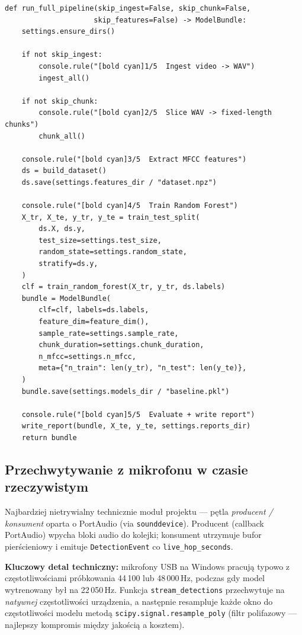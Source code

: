 \documentclass[11pt,a4paper]{article}
\begin{document}
\begin{lstlisting}[caption={Orchestrator treningu (\texttt{pipeline/train.py}, fragment).},label={lst:train}]
def run_full_pipeline(skip_ingest=False, skip_chunk=False,
                     skip_features=False) -> ModelBundle:
    settings.ensure_dirs()

    if not skip_ingest:
        console.rule("[bold cyan]1/5  Ingest video -> WAV")
        ingest_all()

    if not skip_chunk:
        console.rule("[bold cyan]2/5  Slice WAV -> fixed-length chunks")
        chunk_all()

    console.rule("[bold cyan]3/5  Extract MFCC features")
    ds = build_dataset()
    ds.save(settings.features_dir / "dataset.npz")

    console.rule("[bold cyan]4/5  Train Random Forest")
    X_tr, X_te, y_tr, y_te = train_test_split(
        ds.X, ds.y,
        test_size=settings.test_size,
        random_state=settings.random_state,
        stratify=ds.y,
    )
    clf = train_random_forest(X_tr, y_tr, ds.labels)
    bundle = ModelBundle(
        clf=clf, labels=ds.labels,
        feature_dim=feature_dim(),
        sample_rate=settings.sample_rate,
        chunk_duration=settings.chunk_duration,
        n_mfcc=settings.n_mfcc,
        meta={"n_train": len(y_tr), "n_test": len(y_te)},
    )
    bundle.save(settings.models_dir / "baseline.pkl")

    console.rule("[bold cyan]5/5  Evaluate + write report")
    write_report(bundle, X_te, y_te, settings.reports_dir)
    return bundle
\end{lstlisting}

\subsection{Przechwytywanie z mikrofonu w czasie rzeczywistym}

Najbardziej nietrywialny technicznie moduł projektu --- pętla \emph{producent /
konsument} oparta o PortAudio (via \texttt{sounddevice}). Producent (callback
PortAudio) wpycha bloki audio do kolejki; konsument utrzymuje bufor pierścieniowy
i emituje \texttt{DetectionEvent} co \texttt{live\_hop\_seconds}.

\textbf{Kluczowy detal techniczny:} mikrofony USB na Windows pracują typowo z
częstotliwościami próbkowania 44\,100 lub 48\,000\,Hz, podczas gdy model wytre\-no\-wany
był na 22\,050\,Hz. Funkcja \texttt{stream\_detections} przechwytuje na
\emph{natywnej} częstotliwości urządzenia, a następnie resampluje każde okno
do częstotliwości modelu metodą \texttt{scipy.signal.resample\_poly} (filtr
polifazowy --- najlepszy kompromis między jakością a kosztem).
\end{document}
